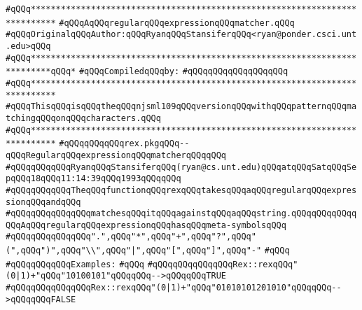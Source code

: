 \label{src/lib/tk/src/toolkit/regExp/rex.pkg}
\verb|#qQQq***************************************************************************|\newline
\verb|#qQQqAqQQqregularqQQqexpressionqQQqmatcher.qQQq|\newline
\verb|#qQQqOriginalqQQqAuthor:qQQqRyanqQQqStansiferqQQq<ryan@ponder.csci.unt.edu>qQQq|\newline
\verb|#qQQq**************************************************************************qQQq*|\newline
\newline
\verb|#qQQqCompiledqQQqby:|\newline
\verb|#qQQqqQQqqQQqqQQqqQQq|\newline
\newline
\verb|#qQQq***************************************************************************|\newline
\verb|#qQQqThisqQQqisqQQqtheqQQqnjsml109qQQqversionqQQqwithqQQqpatternqQQqmatchingqQQqonqQQqcharacters.qQQq|\newline
\verb|#qQQq***************************************************************************|\newline
\newline
\verb|#qQQqqQQqqQQqrex.pkgqQQq--qQQqRegularqQQqexpressionqQQqmatcherqQQqqQQq|\newline
\verb|#qQQqqQQqqQQqRyanqQQqStansiferqQQq(ryan@cs.unt.edu)qQQqatqQQqSatqQQqSepqQQq18qQQq11:14:39qQQq1993qQQqqQQq|\newline
\newline
\verb|#qQQqqQQqqQQqTheqQQqfunctionqQQqrexqQQqtakesqQQqaqQQqregularqQQqexpressionqQQqandqQQq|\newline
\verb|#qQQqqQQqqQQqqQQqmatchesqQQqitqQQqagainstqQQqaqQQqstring.qQQqqQQqqQQqqQQqAqQQqregularqQQqexpressionqQQqhasqQQqmeta-symbolsqQQq|\newline
\verb|#qQQqqQQqqQQqqQQq".",qQQq"*",qQQq"+",qQQq"?",qQQq"(",qQQq")",qQQq"\\",qQQq"|\verb#|",qQQq"[",qQQq"]",qQQq"-"#\newline
\verb|#qQQq|\newline
\verb|#qQQqqQQqqQQqExamples:|\newline
\verb|#qQQq|\newline
\verb|#qQQqqQQqqQQqqQQqRex::rexqQQq"(0|\verb#|1)+"qQQq"10100101"qQQqqQQq-->qQQqqQQqTRUE#\newline
\verb|#qQQqqQQqqQQqqQQqRex::rexqQQq"(0|\verb#|1)+"qQQq"01010101201010"qQQqqQQq-->qQQqqQQqFALSE#\newline
